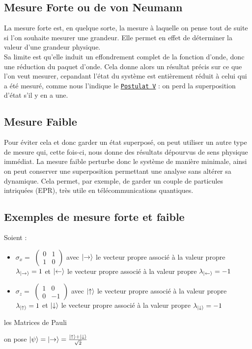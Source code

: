 \documentclass[11pt]{article}
\begin{document}
\subsection{Mesure Forte ou de von Neumann}
\qquad La mesure forte est, en quelque sorte, la mesure à laquelle on pense tout de suite si l'on souhaite mesurer une grandeur. Elle permet en effet de déterminer la valeur d'une grandeur physique.\\
\qquad Sa limite est qu'elle induit un effondrement complet de la fonction d'onde, donc une réduction du paquet d'onde. Cela donne alors un résultat précis sur ce que l'on veut mesurer, cepandant l'état du système est entièrement réduit à celui qui a été mesuré, comme nous l'indique le \hyperref[sec:PV]{\texttt{Postulat V}} : on perd la superposition d'état s'il y en a une.

\subsection{Mesure Faible}
\qquad Pour éviter cela et donc garder un état superposé, on peut utiliser un autre type de mesure qui, cette fois-ci, nous donne des résultats dépourvus de sens physique immédiat.
La mesure faible perturbe donc le système de manière minimale, ainsi on peut conserver une superposition permettant une analyse sans altérer sa dynamique. Cela permet, par exemple, de garder un couple de particules intriquées (EPR), très utile en télécommunications quantiques. %

\subsection{Exemples de mesure forte et faible}
Soient : \\
\begin{itemize}
\renewcommand{\labelitemi}{$\cdot$}
    \item \( \sigma_x = \)
    \( \begin{pmatrix}
    0 & 1 \\
    1 & 0
    \end{pmatrix} \) avec \( \ket{\rightarrow} \) le vecteur propre associé à la valeur propre \( \lambda_{\ket{\rightarrow}} = 1 \) et \( \ket{\leftarrow} \) le vecteur propre associé à la valeur propre \( \lambda_{\ket{\leftarrow}} = -1 \) \\
    \item \( \sigma_z = \)
    \( \begin{pmatrix}
    1 & 0 \\
    0 & -1
    \end{pmatrix} \) avec \( \ket{\uparrow} \) le vecteur propre associé à la valeur propre \( \lambda_{\ket{\uparrow}} = 1 \) et \( \ket{\downarrow} \) le vecteur propre associé à la valeur propre \( \lambda_{\ket{\downarrow}} = -1 \) \\
\end{itemize}
les Matrices de Pauli
 \begin{tabbing}
    on pose \( \ket{\psi} = \ket{\rightarrow} = \frac{\ket{\uparrow} + \ket{\downarrow}}{\sqrt{2}} \)
    
\end{tabbing}
\end{document}
